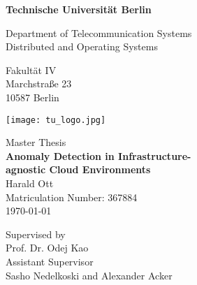 \thispagestyle{empty}
\begin{center}

\vspace*{1.4cm}
{\LARGE \textbf{Technische Universit\"at Berlin}}

\vspace{0.5cm}

{\large Department of Telecommunication Systems\\[1mm]}
{\large Distributed and Operating Systems\\[5mm]}

Fakult\"at IV\\
Marchstraße 23\\
10587 Berlin\\

\vspace*{1cm}

\texttt{[image: tu\_logo.jpg]}

\vspace*{1.0cm}

{\LARGE Master Thesis}\\

\vspace{1.0cm}
{\LARGE \textbf{Anomaly Detection in Infrastructure-}}\\
\vspace*{0.3cm}
{\LARGE \textbf{agnostic Cloud Environments}}\\
\vspace*{1.0cm}
{\LARGE Harald Ott}
\\
\vspace*{0.5cm}
Matriculation Number: 367884\\
\today\\ %
\vspace*{1.0cm}

Supervised by\\
Prof. Dr. Odej Kao\\
\vspace*{0.5cm}
Assistant Supervisor\\
Sasho Nedelkoski and Alexander Acker
\vspace{3cm}


\end{center}

